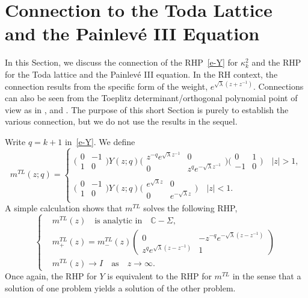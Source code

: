 \documentclass{amsart}
\theoremstyle{definition}
\theoremstyle{remark}
\numberwithin{equation}{section}
\newcommand{\C}{\mathbb C}
\begin{document}
\section{{\bf Connection to the Toda Lattice and the Painlev\'e III Equation}}
\label{s-TL}

In this Section, we discuss the connection of the RHP~\eqref{e-Y} 
for $\kappa^2_k$ and the RHP for the Toda lattice 
and the Painlev\'e III equation. 
In the RH context, the connection results from 
the specific form of the weight, $e^{\sqrt{\lambda}(z+z^{-1})}$. 
Connections can also be seen from the Toeplitz determinant/orthogonal 
polynomial point of view as in \cite{PS}, \cite{Hi} and \cite{Wi}.
The purpose of this short Section is purely to establish the 
various connection, but we do not use the results in the sequel.

\bigskip
Write $q=k+1$ in~\eqref{e-Y}.
We define 
\begin{equation}\label{e-sTL1}
   m^{TL}(z;q)=
   \begin{cases}
\biggl( \begin{smallmatrix} 0&-1\\1&0 \end{smallmatrix} \biggr) Y(z;q)
\biggl( \begin{smallmatrix} z^{-q}e^{\sqrt{\lambda}z^{-1}}&0\\
0&z^{q}e^{-\sqrt{\lambda}z^{-1}} \end{smallmatrix} \biggr)
\biggl( \begin{smallmatrix} 0&1\\-1&0 \end{smallmatrix} \biggr) \quad |z|>1,\\
\biggl( \begin{smallmatrix} 0&-1\\1&0 \end{smallmatrix} \biggr)Y(z;q)
\biggl( \begin{smallmatrix} e^{\sqrt{\lambda}z}&0\\
0&e^{-\sqrt{\lambda}z} \end{smallmatrix} \biggr) \quad |z|<1.
 \end{cases}
\end{equation}
A simple calculation shows that $m^{TL}$ solves the following RHP,
\begin{equation}\label{e-TL3}
  \begin{cases}
   &m^{TL}(z) \quad\text{is analytic in} \quad \C-\Sigma,\\
   &m^{TL}_+(z)=m^{TL}_-(z)\begin{pmatrix}
0&-z^{-q}e^{-\sqrt{\lambda}(z-z^{-1})}\\
z^{q}e^{\sqrt{\lambda}(z-z^{-1})}&1 \end{pmatrix}\\
   &m^{TL}(z)\to I \quad\text{as} \quad z\to\infty.
  \end{cases}
\end{equation}
Once again, the RHP for $Y$ is equivalent to the RHP for $m^{TL}$ 
in the sense that a solution of one problem yields a solution
of the other problem.
\end{document}
